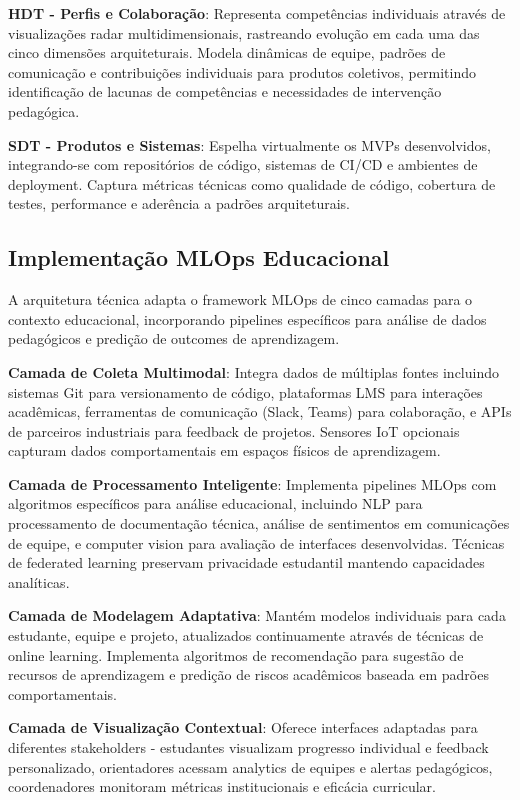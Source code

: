 \documentclass[english, spanish, brazilian]{RBIEarticle} %
\begin{document}
\textbf{HDT - Perfis e Colaboração}: Representa competências individuais através de visualizações radar multidimensionais, rastreando evolução em cada uma das cinco dimensões arquiteturais. Modela dinâmicas de equipe, padrões de comunicação e contribuições individuais para produtos coletivos, permitindo identificação de lacunas de competências e necessidades de intervenção pedagógica.

\textbf{SDT - Produtos e Sistemas}: Espelha virtualmente os MVPs desenvolvidos, integrando-se com repositórios de código, sistemas de CI/CD e ambientes de deployment. Captura métricas técnicas como qualidade de código, cobertura de testes, performance e aderência a padrões arquiteturais.

\subsection{Implementação MLOps Educacional}

A arquitetura técnica adapta o framework MLOps de cinco camadas para o contexto
educacional, incorporando pipelines específicos para análise de dados
pedagógicos e predição de outcomes de aprendizagem.

\textbf{Camada de Coleta Multimodal}: Integra dados de múltiplas fontes incluindo sistemas Git para versionamento de código, plataformas LMS para interações acadêmicas, ferramentas de comunicação (Slack, Teams) para colaboração, e APIs de parceiros industriais para feedback de projetos. Sensores IoT opcionais capturam dados comportamentais em espaços físicos de aprendizagem.

\textbf{Camada de Processamento Inteligente}: Implementa pipelines MLOps com algoritmos específicos para análise educacional, incluindo NLP para processamento de documentação técnica, análise de sentimentos em comunicações de equipe, e computer vision para avaliação de interfaces desenvolvidas. Técnicas de federated learning preservam privacidade estudantil mantendo capacidades analíticas.

\textbf{Camada de Modelagem Adaptativa}: Mantém modelos individuais para cada estudante, equipe e projeto, atualizados continuamente através de técnicas de online learning. Implementa algoritmos de recomendação para sugestão de recursos de aprendizagem e predição de riscos acadêmicos baseada em padrões comportamentais.

\textbf{Camada de Visualização Contextual}: Oferece interfaces adaptadas para diferentes stakeholders - estudantes visualizam progresso individual e feedback personalizado, orientadores acessam analytics de equipes e alertas pedagógicos, coordenadores monitoram métricas institucionais e eficácia curricular.
\end{document}
